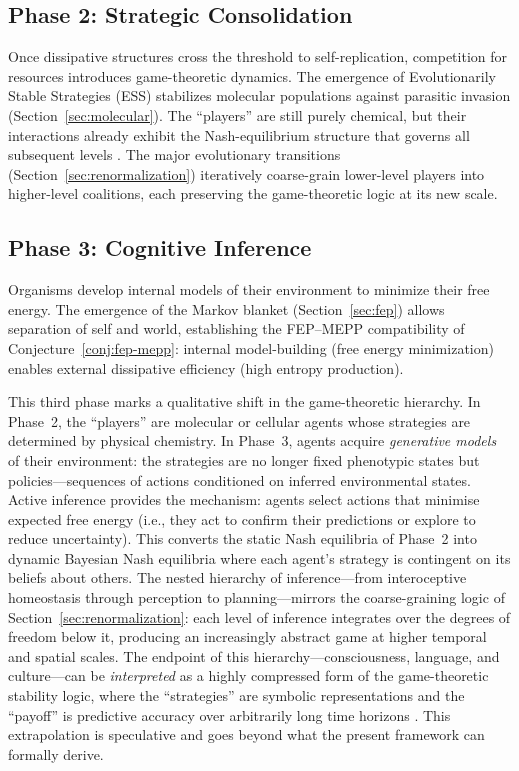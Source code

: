 \documentclass[12pt,a4paper]{article}
\theoremstyle{remark}
\begin{document}
\subsection{Phase 2: Strategic Consolidation}

Once dissipative structures cross the threshold to self-replication, competition for resources introduces game-theoretic dynamics. The emergence of Evolutionarily Stable Strategies (ESS) stabilizes molecular populations against parasitic invasion (Section~\ref{sec:molecular}). The ``players'' are still purely chemical, but their interactions already exhibit the Nash-equilibrium structure that governs all subsequent levels \citep{MaynardSmithPrice1973}. The major evolutionary transitions (Section~\ref{sec:renormalization}) iteratively coarse-grain lower-level players into higher-level coalitions, each preserving the game-theoretic logic at its new scale.

\subsection{Phase 3: Cognitive Inference}

Organisms develop internal models of their environment to minimize their free energy. The emergence of the Markov blanket (Section~\ref{sec:fep}) allows separation of self and world, establishing the FEP--MEPP compatibility of Conjecture~\ref{conj:fep-mepp}: internal model-building (free energy minimization) enables external dissipative efficiency (high entropy production).

This third phase marks a qualitative shift in the game-theoretic hierarchy. In Phase~2, the ``players'' are molecular or cellular agents whose strategies are determined by physical chemistry. In Phase~3, agents acquire \emph{generative models} of their environment: the strategies are no longer fixed phenotypic states but policies---sequences of actions conditioned on inferred environmental states. Active inference \citep{FristonFreeEnergy} provides the mechanism: agents select actions that minimise expected free energy (i.e., they act to confirm their predictions or explore to reduce uncertainty). This converts the static Nash equilibria of Phase~2 into dynamic Bayesian Nash equilibria where each agent's strategy is contingent on its beliefs about others. The nested hierarchy of inference---from interoceptive homeostasis through perception to planning---mirrors the coarse-graining logic of Section~\ref{sec:renormalization}: each level of inference integrates over the degrees of freedom below it, producing an increasingly abstract game at higher temporal and spatial scales. The endpoint of this hierarchy---consciousness, language, and culture---can be \emph{interpreted} as a highly compressed form of the game-theoretic stability logic, where the ``strategies'' are symbolic representations and the ``payoff'' is predictive accuracy over arbitrarily long time horizons \citep{FristonPDF}. This extrapolation is speculative and goes beyond what the present framework can formally derive.
\end{document}
